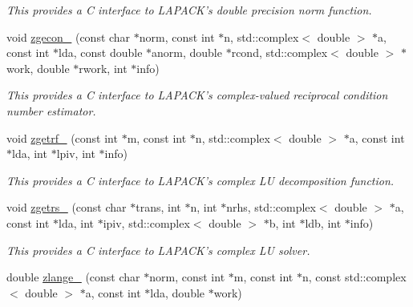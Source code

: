 \begin{DoxyCompactItemize}
\begin{DoxyCompactList}\small\item\em This provides a C interface to L\-A\-P\-A\-C\-K's double precision norm function. \end{DoxyCompactList}\item 
\hypertarget{namespacekeycpp_a444e3cdc7e7929414370b6b50ea1218c}{void \hyperlink{namespacekeycpp_a444e3cdc7e7929414370b6b50ea1218c}{zgecon\-\_\-} (const char $\ast$norm, const int $\ast$n, std\-::complex$<$ double $>$ $\ast$a, const int $\ast$lda, const double $\ast$anorm, double $\ast$rcond, std\-::complex$<$ double $>$ $\ast$work, double $\ast$rwork, int $\ast$info)}\label{namespacekeycpp_a444e3cdc7e7929414370b6b50ea1218c}

\begin{DoxyCompactList}\small\item\em This provides a C interface to L\-A\-P\-A\-C\-K's complex-\/valued reciprocal condition number estimator. \end{DoxyCompactList}\item 
\hypertarget{namespacekeycpp_ab18d58d53d8e19a37d74d24da27a64dd}{void \hyperlink{namespacekeycpp_ab18d58d53d8e19a37d74d24da27a64dd}{zgetrf\-\_\-} (const int $\ast$m, const int $\ast$n, std\-::complex$<$ double $>$ $\ast$a, const int $\ast$lda, int $\ast$lpiv, int $\ast$info)}\label{namespacekeycpp_ab18d58d53d8e19a37d74d24da27a64dd}

\begin{DoxyCompactList}\small\item\em This provides a C interface to L\-A\-P\-A\-C\-K's complex L\-U decomposition function. \end{DoxyCompactList}\item 
\hypertarget{namespacekeycpp_abbe4322276dcdb7d864e85854b5b90f2}{void \hyperlink{namespacekeycpp_abbe4322276dcdb7d864e85854b5b90f2}{zgetrs\-\_\-} (const char $\ast$trans, int $\ast$n, int $\ast$nrhs, std\-::complex$<$ double $>$ $\ast$a, const int $\ast$lda, int $\ast$ipiv, std\-::complex$<$ double $>$ $\ast$b, int $\ast$ldb, int $\ast$info)}\label{namespacekeycpp_abbe4322276dcdb7d864e85854b5b90f2}

\begin{DoxyCompactList}\small\item\em This provides a C interface to L\-A\-P\-A\-C\-K's complex L\-U solver. \end{DoxyCompactList}\item 
\hypertarget{namespacekeycpp_a1477c910b07baef984fe8528c29b2774}{double \hyperlink{namespacekeycpp_a1477c910b07baef984fe8528c29b2774}{zlange\-\_\-} (const char $\ast$norm, const int $\ast$m, const int $\ast$n, const std\-::complex$<$ double $>$ $\ast$a, const int $\ast$lda, double $\ast$work)}\label{namespacekeycpp_a1477c910b07baef984fe8528c29b2774}


\end{DoxyCompactItemize}

